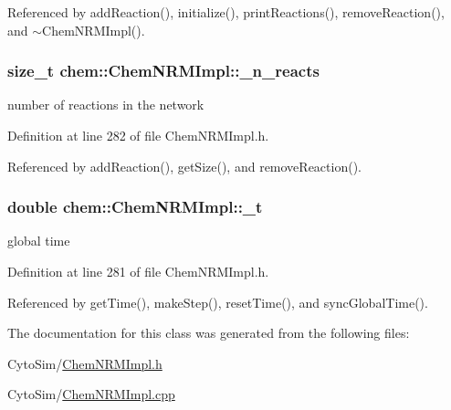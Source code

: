 Referenced by add\-Reaction(), initialize(), print\-Reactions(), remove\-Reaction(), and $\sim$\-Chem\-N\-R\-M\-Impl().

\hypertarget{classchem_1_1ChemNRMImpl_a7e53992b28e926d1a19f3fd7dea171c3}{
\subsubsection[{\-\_\-n\-\_\-reacts}]{\setlength{\rightskip}{0pt plus 5cm}size\-\_\-t {\bf chem\-::\-Chem\-N\-R\-M\-Impl\-::\-\_\-n\-\_\-reacts}}}\label{classchem_1_1ChemNRMImpl_a7e53992b28e926d1a19f3fd7dea171c3}


number of reactions in the network 



Definition at line 282 of file Chem\-N\-R\-M\-Impl.\-h.



Referenced by add\-Reaction(), get\-Size(), and remove\-Reaction().

\hypertarget{classchem_1_1ChemNRMImpl_a1b14f424d72d3c5b0aafe31d7b7c4f82}{
\subsubsection[{\-\_\-t}]{\setlength{\rightskip}{0pt plus 5cm}double {\bf chem\-::\-Chem\-N\-R\-M\-Impl\-::\-\_\-t}}}\label{classchem_1_1ChemNRMImpl_a1b14f424d72d3c5b0aafe31d7b7c4f82}


global time 



Definition at line 281 of file Chem\-N\-R\-M\-Impl.\-h.



Referenced by get\-Time(), make\-Step(), reset\-Time(), and sync\-Global\-Time().



The documentation for this class was generated from the following files\-:\begin{DoxyCompactItemize}
\item 
Cyto\-Sim/\hyperlink{ChemNRMImpl_8h}{Chem\-N\-R\-M\-Impl.\-h}\item 
Cyto\-Sim/\hyperlink{ChemNRMImpl_8cpp}{Chem\-N\-R\-M\-Impl.\-cpp}\end{DoxyCompactItemize}
